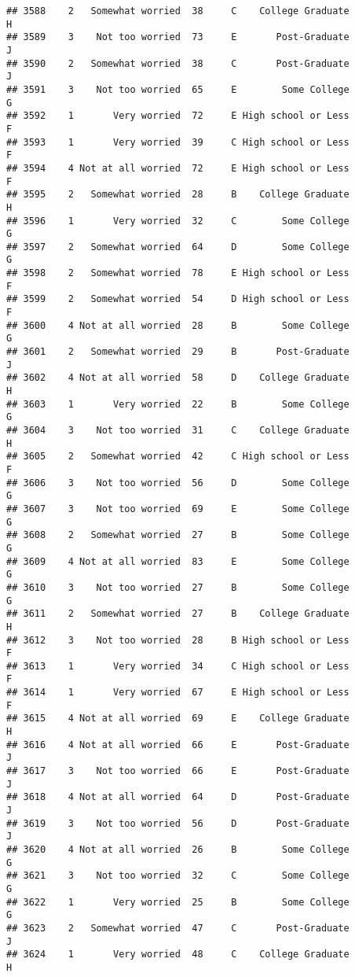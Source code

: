 \documentclass[
]{article}
\begin{document}
\begin{verbatim}
## 3588    2   Somewhat worried  38     C    College Graduate         H
## 3589    3    Not too worried  73     E       Post-Graduate         J
## 3590    2   Somewhat worried  38     C       Post-Graduate         J
## 3591    3    Not too worried  65     E        Some College         G
## 3592    1       Very worried  72     E High school or Less         F
## 3593    1       Very worried  39     C High school or Less         F
## 3594    4 Not at all worried  72     E High school or Less         F
## 3595    2   Somewhat worried  28     B    College Graduate         H
## 3596    1       Very worried  32     C        Some College         G
## 3597    2   Somewhat worried  64     D        Some College         G
## 3598    2   Somewhat worried  78     E High school or Less         F
## 3599    2   Somewhat worried  54     D High school or Less         F
## 3600    4 Not at all worried  28     B        Some College         G
## 3601    2   Somewhat worried  29     B       Post-Graduate         J
## 3602    4 Not at all worried  58     D    College Graduate         H
## 3603    1       Very worried  22     B        Some College         G
## 3604    3    Not too worried  31     C    College Graduate         H
## 3605    2   Somewhat worried  42     C High school or Less         F
## 3606    3    Not too worried  56     D        Some College         G
## 3607    3    Not too worried  69     E        Some College         G
## 3608    2   Somewhat worried  27     B        Some College         G
## 3609    4 Not at all worried  83     E        Some College         G
## 3610    3    Not too worried  27     B        Some College         G
## 3611    2   Somewhat worried  27     B    College Graduate         H
## 3612    3    Not too worried  28     B High school or Less         F
## 3613    1       Very worried  34     C High school or Less         F
## 3614    1       Very worried  67     E High school or Less         F
## 3615    4 Not at all worried  69     E    College Graduate         H
## 3616    4 Not at all worried  66     E       Post-Graduate         J
## 3617    3    Not too worried  66     E       Post-Graduate         J
## 3618    4 Not at all worried  64     D       Post-Graduate         J
## 3619    3    Not too worried  56     D       Post-Graduate         J
## 3620    4 Not at all worried  26     B        Some College         G
## 3621    3    Not too worried  32     C        Some College         G
## 3622    1       Very worried  25     B        Some College         G
## 3623    2   Somewhat worried  47     C       Post-Graduate         J
## 3624    1       Very worried  48     C    College Graduate         H

\end{verbatim}
\end{document}
